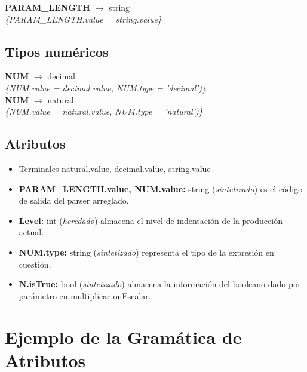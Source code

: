\documentclass[10pt,a4paper]{article}
\begin{document}
\textbf{PARAM\_LENGTH} $\rightarrow$ string \\
\textit{\{PARAM\_LENGTH.value = string.value\}} \\

\subsection{Tipos numéricos}
\textbf{NUM} $\rightarrow$ decimal \\
\textit{\{NUM.value = decimal.value, NUM.type = 'decimal')\}}  \\ 

\textbf{NUM} $\rightarrow$ natural \\
\textit{\{NUM.value = natural.value, NUM.type = 'natural')\}}  \\ 

\subsection{Atributos}

\begin{itemize}
\item Terminales natural.value, decimal.value, string.value
\item \textbf{PARAM\_LENGTH.value, NUM.value:} string (\textit{sintetizado}) es el código de salida del parser arreglado.
\item \textbf{Level:} int (\textit{heredado}) almacena el nivel de indentación de la producción actual.
\item \textbf{NUM.type:} string (\textit{sintetizado}) representa el tipo de la expresión en cuestión.
\item \textbf{N.isTrue:} bool (\textit{sintetizado}) almacena la información del booleano dado por parámetro en multiplicacionEscalar.
\end{itemize}

\section{Ejemplo de la Gramática de Atributos}
\end{document}
